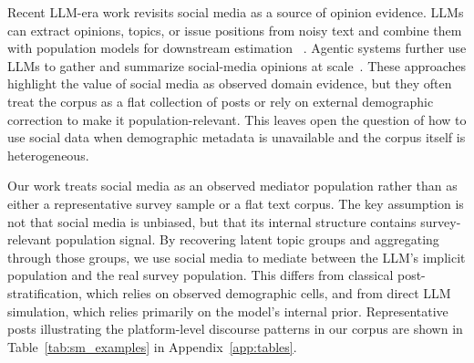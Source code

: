 \documentclass{article}
\begin{document}
Recent LLM-era work revisits social media as a source of opinion evidence.
LLMs can extract opinions, topics, or issue positions from noisy text and
combine them with population models for downstream estimation
~\cite{cerina2024ai}.
Agentic systems further use LLMs to gather and summarize social-media
opinions at scale~\cite{surveypilot2024}.
These approaches highlight the value of social media as observed domain
evidence, but they often treat the corpus as a flat collection of posts or
rely on external demographic correction to make it population-relevant.
This leaves open the question of how to use social data when demographic
metadata is unavailable and the corpus itself is heterogeneous.

Our work treats social media as an observed mediator population rather than
as either a representative survey sample or a flat text corpus.
The key assumption is not that social media is unbiased, but that its
internal structure contains survey-relevant population signal.
By recovering latent topic groups and aggregating through those groups, we
use social media to mediate between the LLM's implicit population and the
real survey population.
This differs from classical post-stratification, which relies on observed
demographic cells, and from direct LLM simulation, which relies primarily on
the model's internal prior.
Representative posts illustrating the platform-level discourse patterns in our corpus are shown in Table~\ref{tab:sm_examples} in Appendix~\ref{app:tables}.
\end{document}
